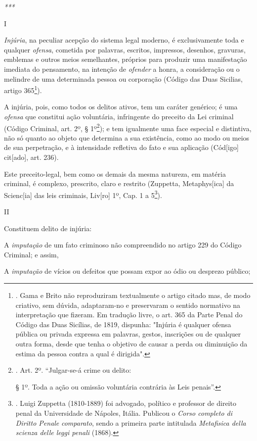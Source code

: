 \emph{***}

I

\emph{Injúria}, na peculiar acepção do sistema legal moderno, é
exclusivamente toda e qualquer \emph{ofensa}, cometida por palavras,
escritos, impressos, desenhos, gravuras, emblemas e outros meios
semelhantes, próprios para produzir uma manifestação imediata do
pensamento, na intenção de \emph{ofender} a honra, a consideração ou o
melindre de uma determinada pessoa ou corporação (Código das Duas
Sicilias, artigo 365\footnote{. Gama e Brito não reproduziram
  textualmente o artigo citado mas, de modo criativo, sem dúvida,
  adaptaram-no e preservaram o sentido normativo na interpretação que
  fizeram. Em tradução livre, o art. 365 da Parte Penal do Código das
  Duas Sicílias, de 1819, dispunha: "Injúria é qualquer ofensa pública
  ou privada expressa em palavras, gestos, inscrições ou de qualquer
  outra forma, desde que tenha o objetivo de causar a perda ou
  diminuição da estima da pessoa contra a qual é dirigida".}).

A injúria, pois, como todos os delitos ativos, tem um caráter genérico;
é uma \emph{ofensa} que constitui ação voluntária, infringente do
preceito da Lei criminal (Código Criminal, art. 2º, § 1º\footnote{. Art.
  2º. ``Julgar-se-á crime ou delito:

  § 1º. Toda a ação ou omissão voluntária contrária às Leis penais''.});
e tem igualmente uma face especial e distintiva, não só quanto ao objeto
que determina a sua existência, como ao modo ou meios de sua
perpetração, e à intensidade refletiva do fato e sua aplicação
(Cód{[}igo{]} cit{[}ado{]}, art. 236).

Este preceito-legal, bem como os demais da mesma natureza, em matéria
criminal, é complexo, prescrito, claro e restrito (Zuppetta,
Metaphys{[}ica{]} da Scienc{[}ia{]} das leis criminais, Liv{[}ro{]} 1º,
Cap. 1 a 5\footnote{. Luigi Zuppetta (1810-1889) foi advogado, político
  e professor de direito penal da Universidade de Nápoles, Itália.
  Publicou o \emph{Corso completo di Diritto Penale} \emph{comparato},
  sendo a primeira parte intitulada \emph{Metafisica della scienza delle
  leggi penali} (1868).}).

II

Constituem delito de injúria:

A \emph{imputação} de um fato criminoso não compreendido no artigo 229
do Código Criminal; e assim,

A \emph{imputação} de vícios ou defeitos que possam expor ao ódio ou
desprezo público;


